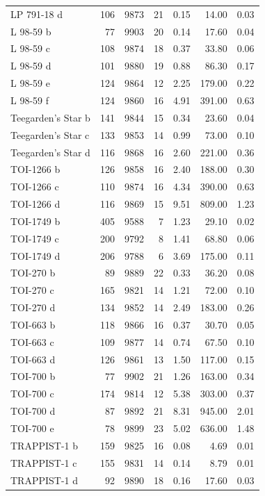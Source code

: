 \begin{table}
\begin{tabular}{lrrrrrr}
LP 791-18 d & 106 & 9873 & 21 & 0.15 & 14.00 & 0.03 \\
L 98-59 b & 77 & 9903 & 20 & 0.14 & 17.60 & 0.04 \\
L 98-59 c & 108 & 9874 & 18 & 0.37 & 33.80 & 0.06 \\
L 98-59 d & 101 & 9880 & 19 & 0.88 & 86.30 & 0.17 \\
L 98-59 e & 124 & 9864 & 12 & 2.25 & 179.00 & 0.22 \\
L 98-59 f & 124 & 9860 & 16 & 4.91 & 391.00 & 0.63 \\
Teegarden's Star b & 141 & 9844 & 15 & 0.34 & 23.60 & 0.04 \\
Teegarden's Star c & 133 & 9853 & 14 & 0.99 & 73.00 & 0.10 \\
Teegarden's Star d & 116 & 9868 & 16 & 2.60 & 221.00 & 0.36 \\
TOI-1266 b & 126 & 9858 & 16 & 2.40 & 188.00 & 0.30 \\
TOI-1266 c & 110 & 9874 & 16 & 4.34 & 390.00 & 0.63 \\
TOI-1266 d & 116 & 9869 & 15 & 9.51 & 809.00 & 1.23 \\
TOI-1749 b & 405 & 9588 & 7 & 1.23 & 29.10 & 0.02 \\
TOI-1749 c & 200 & 9792 & 8 & 1.41 & 68.80 & 0.06 \\
TOI-1749 d & 206 & 9788 & 6 & 3.69 & 175.00 & 0.11 \\
TOI-270 b & 89 & 9889 & 22 & 0.33 & 36.20 & 0.08 \\
TOI-270 c & 165 & 9821 & 14 & 1.21 & 72.00 & 0.10 \\
TOI-270 d & 134 & 9852 & 14 & 2.49 & 183.00 & 0.26 \\
TOI-663 b & 118 & 9866 & 16 & 0.37 & 30.70 & 0.05 \\
TOI-663 c & 109 & 9877 & 14 & 0.74 & 67.50 & 0.10 \\
TOI-663 d & 126 & 9861 & 13 & 1.50 & 117.00 & 0.15 \\
TOI-700 b & 77 & 9902 & 21 & 1.26 & 163.00 & 0.34 \\
TOI-700 c & 174 & 9814 & 12 & 5.38 & 303.00 & 0.37 \\
TOI-700 d & 87 & 9892 & 21 & 8.31 & 945.00 & 2.01 \\
TOI-700 e & 78 & 9899 & 23 & 5.02 & 636.00 & 1.48 \\
TRAPPIST-1 b & 159 & 9825 & 16 & 0.08 & 4.69 & 0.01 \\
TRAPPIST-1 c & 155 & 9831 & 14 & 0.14 & 8.79 & 0.01 \\
TRAPPIST-1 d & 92 & 9890 & 18 & 0.16 & 17.60 & 0.03 \\

\end{tabular}
\end{table}
